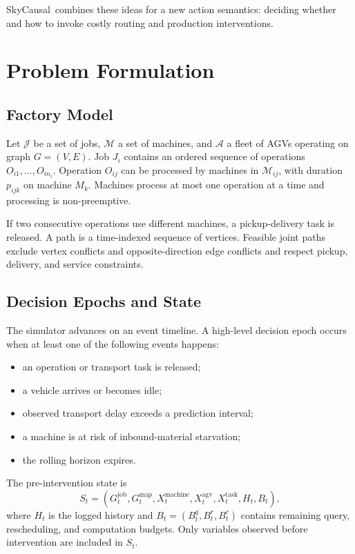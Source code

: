 \documentclass[11pt,a4paper]{article}
\newcommand{\method}{SkyCausal}
\begin{document}
\method\ combines these ideas for a new action semantics: deciding whether and
how to invoke costly routing and production interventions.

\section{Problem Formulation}
\label{sec:problem}

\subsection{Factory Model}

Let \(\mathcal{J}\) be a set of jobs, \(\mathcal{M}\) a set of machines, and
\(\mathcal{A}\) a fleet of AGVs operating on graph \(G=(V,E)\). Job \(J_i\)
contains an ordered sequence of operations
\(O_{i1},\ldots,O_{in_i}\). Operation \(O_{ij}\) can be processed by machines in
\(\mathcal{M}_{ij}\), with duration \(p_{ijk}\) on machine \(M_k\).
Machines process at most one operation at a time and processing is
non-preemptive.

If two consecutive operations use different machines, a pickup-delivery task is
released. A path is a time-indexed sequence of vertices. Feasible joint paths
exclude vertex conflicts and opposite-direction edge conflicts and respect
pickup, delivery, and service constraints.

\subsection{Decision Epochs and State}

The simulator advances on an event timeline. A high-level decision epoch occurs
when at least one of the following events happens:

\begin{itemize}[leftmargin=*]
    \item an operation or transport task is released;
    \item a vehicle arrives or becomes idle;
    \item observed transport delay exceeds a prediction interval;
    \item a machine is at risk of inbound-material starvation;
    \item the rolling horizon expires.
\end{itemize}

The pre-intervention state is
\begin{equation}
    S_t =
    \left(
    G_t^{\mathrm{job}},
    G_t^{\mathrm{map}},
    X_t^{\mathrm{machine}},
    X_t^{\mathrm{agv}},
    X_t^{\mathrm{task}},
    H_t,
    B_t
    \right),
    \label{eq:state}
\end{equation}
where \(H_t\) is the logged history and \(B_t=(B_t^q,B_t^r,B_t^c)\) contains
remaining query, rescheduling, and computation budgets. Only variables observed
before intervention are included in \(S_t\).
\end{document}
